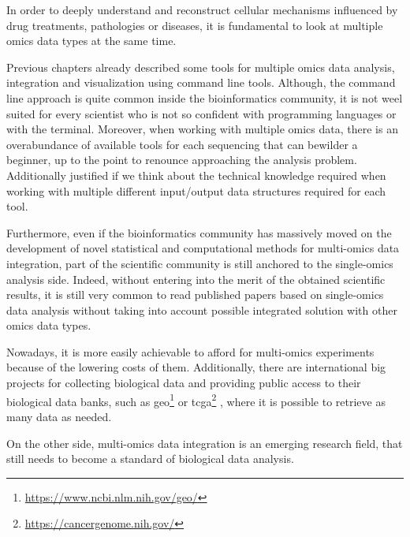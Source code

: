 In order to deeply understand and reconstruct cellular mechanisms influenced by drug treatments, pathologies or diseases, it is fundamental to look at multiple omics data types at the same time.

Previous chapters already described some tools for multiple omics data analysis, integration and visualization using command line tools.
Although, the command line approach is quite common inside the bioinformatics community, it is not weel suited for every scientist who is not so confident with programming languages or with the terminal.
Moreover, when working with multiple omics data, there is an overabundance of available tools for each sequencing that can bewilder a beginner, up to the point to renounce approaching the analysis problem.
Additionally justified if we think about the technical knowledge required when working with multiple different input/output data structures required for each tool.



Furthermore, even if the bioinformatics community has massively moved on the development of novel statistical and computational methods for multi-omics data integration, part of the scientific community is still anchored to the single-omics analysis side.
Indeed, without entering into the merit of the obtained scientific results, it is still very common to read published papers based on single-omics data analysis without taking into account possible integrated solution with other omics data types.

Nowadays, it is more easily achievable to afford for multi-omics experiments because of the lowering costs of them.
Additionally, there are international big projects for collecting biological data and providing public access to their biological data banks, such as \gls{geo}\footnote{\url{https://www.ncbi.nlm.nih.gov/geo/}} \cite{Services2007} or \gls{tcga}\footnote{\url{https://cancergenome.nih.gov/}} \cite{tcga2013a}, where it is possible to retrieve as many data as needed.

On the other side, multi-omics data integration is an emerging research field, that still needs to become a standard of biological data analysis.


